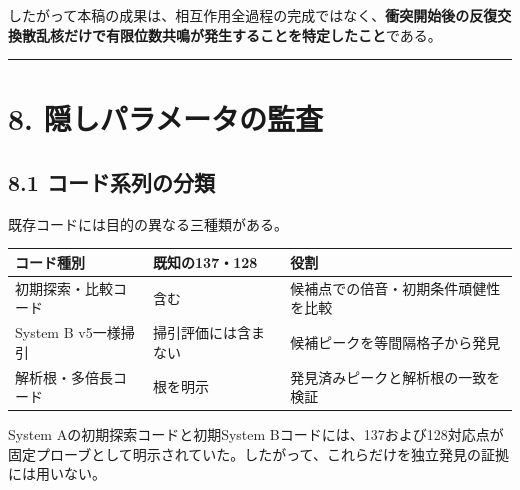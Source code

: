 \documentclass[
  10pt,
  a4paper,
]{article}
\newcounter{none} %
\begin{document}
したがって本稿の成果は、相互作用全過程の完成ではなく、\textbf{衝突開始後の反復交換散乱核だけで有限位数共鳴が発生することを特定したこと}である。

\begin{center}\rule{0.5\linewidth}{0.5pt}\end{center}

\section{8.
隠しパラメータの監査}\label{ux96a0ux3057ux30d1ux30e9ux30e1ux30fcux30bfux306eux76e3ux67fb}

\subsection{8.1
コード系列の分類}\label{ux30b3ux30fcux30c9ux7cfbux5217ux306eux5206ux985e}

既存コードには目的の異なる三種類がある。

{\def\LTcaptype{none} %
\begin{longtable}[]{@{}
  >{\raggedright\arraybackslash}p{}
  >{\raggedright\arraybackslash}p{}
  >{\raggedright\arraybackslash}p{}@{}}
\toprule\noalign{}
\begin{minipage}[b]{\linewidth}\raggedright
コード種別
\end{minipage} & \begin{minipage}[b]{\linewidth}\raggedright
既知の137・128
\end{minipage} & \begin{minipage}[b]{\linewidth}\raggedright
役割
\end{minipage} \\
\midrule\noalign{}
\endhead
\bottomrule\noalign{}
\endlastfoot
初期探索・比較コード & 含む & 候補点での倍音・初期条件頑健性を比較 \\
System B v5一様掃引 & 掃引評価には含まない &
候補ピークを等間隔格子から発見 \\
解析根・多倍長コード & 根を明示 & 発見済みピークと解析根の一致を検証 \\
\end{longtable}
}

System Aの初期探索コードと初期System
Bコードには、137および128対応点が固定プローブとして明示されていた。したがって、これらだけを独立発見の証拠には用いない。
\end{document}

